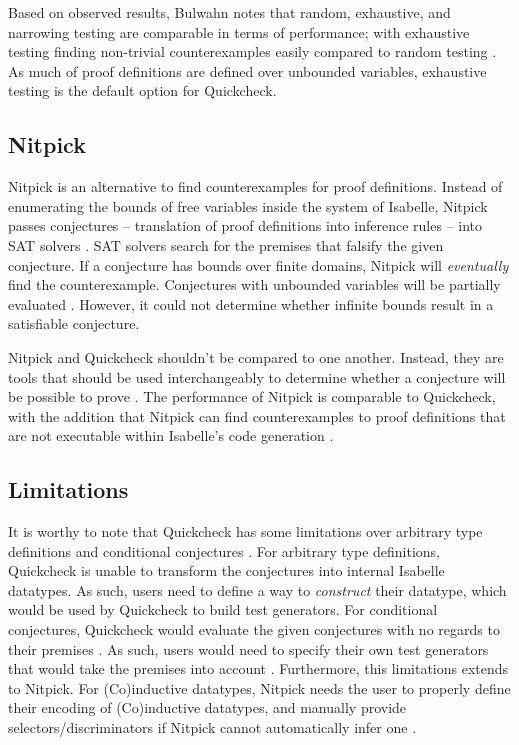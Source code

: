 Based on observed results, Bulwahn notes that random, exhaustive, and narrowing testing are comparable in terms of performance; with 
exhaustive testing finding non-trivial counterexamples easily compared to random testing \cite[Sec. 7]{isabelleQuickcheck}. As much of  
proof definitions are defined over unbounded variables, exhaustive testing is the default option for Quickcheck.

\subsection{Nitpick}
\label{sec:Nitpick}

Nitpick is an alternative to find counterexamples for proof definitions. Instead of enumerating the bounds of free variables inside the 
system of Isabelle, Nitpick passes conjectures -- translation of proof definitions into inference rules -- into SAT solvers 
\cite[Sec. 5]{isabelleProof}. SAT solvers search for the premises that falsify the given conjecture. If a conjecture 
has bounds over finite domains, Nitpick will \emph{eventually} find the counterexample. Conjectures with unbounded variables will be partially 
evaluated \cite[Sec. 5.2]{isabelleProof}. However, it could not determine whether infinite bounds result in a satisfiable conjecture.

Nitpick and Quickcheck shouldn't be compared to one another. Instead, they are tools that should be used interchangeably to determine 
whether a conjecture will be possible to prove \cite{isabelleQuickcheck}. The performance of Nitpick is comparable to Quickcheck, with 
the addition that Nitpick can find counterexamples to proof definitions that are not executable within Isabelle's code generation 
\cite[Sec. 7]{isabelleQuickcheck}.

\subsection{Limitations}
\label{sec:IsabelleLimitations}

It is worthy to note that Quickcheck has some limitations over arbitrary type definitions \cite[Sec. 3.1]{isabelleQuickcheck} 
and conditional conjectures \cite[Sec. 4]{isabelleQuickcheck}. For arbitrary type definitions, Quickcheck is unable to transform the conjectures 
into internal Isabelle datatypes. As such, users need to define a way to \emph{construct} their datatype, which would be used by Quickcheck 
to build test generators. For conditional conjectures, Quickcheck would evaluate the given conjectures with no regards to their premises 
\cite[Sec. 4]{isabelleQuickcheck}. As such, users would need to specify their own test generators that would take the premises into account 
\cite[Sec. 4.1]{isabelleQuickcheck}. Furthermore, this limitations extends to Nitpick. For (Co)inductive datatypes, Nitpick needs the user to 
properly define their encoding of (Co)inductive datatypes, and manually provide selectors/discriminators if Nitpick cannot automatically infer 
one \cite[Sec. 5.4]{isabelleProof}.

